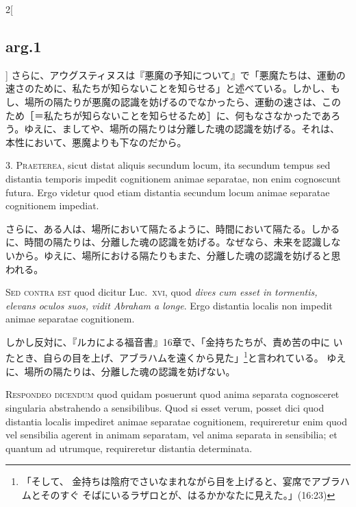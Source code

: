 \documentclass[paper=a4paper,fontsize=10pt,jafontsize=9pt,titlepage]{jlreq}
\begin{document}
\begin{paracol}{2}[\subsection{arg.1}]
さらに、アウグスティヌスは『悪魔の予知について』で「悪魔たちは、運動の
速さのために、私たちが知らないことを知らせる」と述べている。しかし、も
し、場所の隔たりが悪魔の認識を妨げるのでなかったら、運動の速さは、この
ため［＝私たちが知らないことを知らせるため］に、何もなさなかったであろ
う。ゆえに、ましてや、場所の隔たりは分離した魂の認識を妨げる。それは、
本性において、悪魔よりも下なのだから。


3. {\scshape Praeterea}, sicut distat aliquis secundum locum, ita secundum
tempus sed distantia temporis impedit cognitionem animae separatae,
non enim cognoscunt futura. Ergo videtur quod etiam distantia secundum
locum animae separatae cognitionem impediat.

\switchcolumn

さらに、ある人は、場所において隔たるように、時間において隔たる。しかる
に、時間の隔たりは、分離した魂の認識を妨げる。なぜなら、未来を認識しな
いから。ゆえに、場所における隔たりもまた、分離した魂の認識を妨げると思
われる。

\switchcolumn*[\subsection{s.c.}]

{\scshape Sed contra est} quod dicitur Luc.~{\scshape xvi}, quod {\itshape dives cum
esset in tormentis, elevans oculos suos, vidit Abraham a longe}. Ergo
distantia localis non impedit animae separatae cognitionem.

\switchcolumn

しかし反対に、『ルカによる福音書』16章で、「金持ちたちが、責め苦の中に
いたとき、自らの目を上げ、アブラハムを遠くから見た」\footnote{「そして、
金持ちは陰府でさいなまれながら目を上げると、宴席でアブラハムとそのすぐ
そばにいるラザロとが、はるかかなたに見えた。」(16:23)}と言われている。
ゆえに、場所の隔たりは、分離した魂の認識を妨げない。


{\scshape Respondeo dicendum} quod quidam posuerunt quod anima separata
cognosceret singularia abstrahendo a sensibilibus. Quod si esset
verum, posset dici quod distantia localis impediret animae separatae
cognitionem, requireretur enim quod vel sensibilia agerent in animam
separatam, vel anima separata in sensibilia; et quantum ad utrumque,
requireretur distantia determinata.


\end{paracol}
\end{document}
